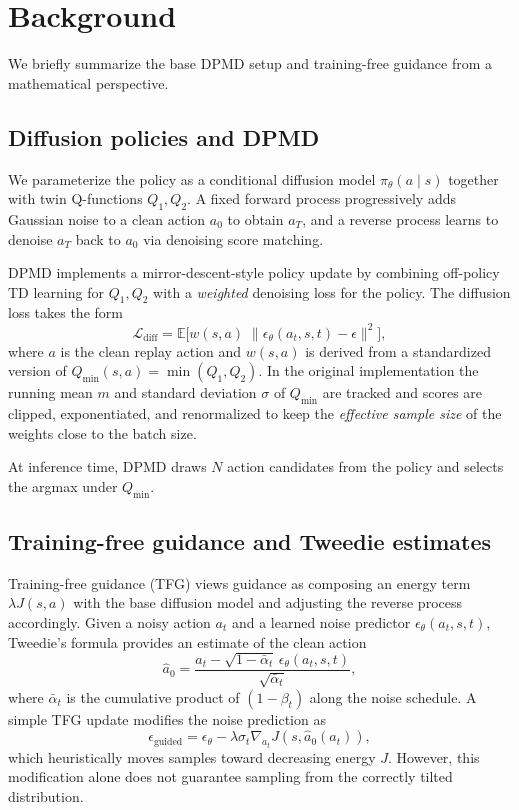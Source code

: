 \documentclass{article}
\theoremstyle{plain}
\theoremstyle{definition}
\theoremstyle{remark}
\newcommand{\E}{\mathbb{E}}
\begin{document}
\section{Background}
\label{sec:background}

We briefly summarize the base DPMD setup and training-free guidance from a mathematical perspective.

\subsection{Diffusion policies and DPMD}

We parameterize the policy as a conditional diffusion model $\pi_\theta(a\mid s)$ together with twin Q-functions $Q_1,Q_2$.
A fixed forward process progressively adds Gaussian noise to a clean action $a_0$ to obtain $a_T$, and a reverse process learns to denoise $a_T$ back to $a_0$ via denoising score matching.

DPMD implements a mirror-descent-style policy update by combining off-policy TD learning for $Q_1,Q_2$ with a \emph{weighted} denoising loss for the policy.
The diffusion loss takes the form
\begin{equation}
  \mathcal{L}_{\text{diff}} = \E\big[ w(s,a) \; \| \epsilon_\theta(a_t,s,t) - \epsilon \|^2 \big],
\end{equation}
where $a$ is the clean replay action and $w(s,a)$ is derived from a standardized version of $Q_{\min}(s,a) = \min(Q_1,Q_2)$.
In the original implementation the running mean $m$ and standard deviation $\sigma$ of $Q_{\min}$ are tracked and scores are clipped, exponentiated, and renormalized to keep the \emph{effective sample size} of the weights close to the batch size.

At inference time, DPMD draws $N$ action candidates from the policy and selects the argmax under $Q_{\min}$.

\subsection{Training-free guidance and Tweedie estimates}

Training-free guidance (TFG) \citep{ye2024tfg,bansal2023universal} views guidance as composing an energy term $\lambda J(s,a)$ with the base diffusion model and adjusting the reverse process accordingly.
Given a noisy action $a_t$ and a learned noise predictor $\epsilon_\theta(a_t,s,t)$, Tweedie's formula provides an estimate of the clean action
\begin{equation}
  \hat{a}_0 = \frac{a_t - \sqrt{1-\bar{\alpha}_t}\, \epsilon_\theta(a_t,s,t)}{\sqrt{\bar{\alpha}_t}},
\end{equation}
where $\bar{\alpha}_t$ is the cumulative product of $(1-\beta_t)$ along the noise schedule.
A simple TFG update modifies the noise prediction as
\begin{equation}
  \epsilon_{\text{guided}} = \epsilon_\theta - \lambda \sigma_t \nabla_{a_t} J(s,\hat{a}_0(a_t)),
\end{equation}
which heuristically moves samples toward decreasing energy $J$.
However, this modification alone does not guarantee sampling from the correctly tilted distribution.
\end{document}
